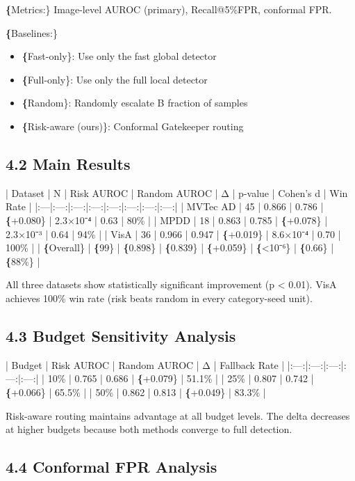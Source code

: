 \documentclass[10pt]{article}
\begin{document}
\textbf\{Metrics:\} Image-level AUROC (primary), Recall@5\%FPR, conformal FPR.

\textbf\{Baselines:\}
\begin{itemize}
\item \textbf\{Fast-only\}: Use only the fast global detector
\item \textbf\{Full-only\}: Use only the full local detector
\item \textbf\{Random\}: Randomly escalate B fraction of samples
\item \textbf\{Risk-aware (ours)\}: Conformal Gatekeeper routing
\end{itemize}

\subsection{4.2 Main Results}

| Dataset | N | Risk AUROC | Random AUROC | Δ | p-value | Cohen's d | Win Rate |
|:---|:---:|:---:|:---:|:---:|:---:|:---:|:---:|
| MVTec AD | 45 | 0.866 | 0.786 | \textbf\{+0.080\} | 2.3×10⁻⁴ | 0.63 | 80\% |
| MPDD | 18 | 0.863 | 0.785 | \textbf\{+0.078\} | 2.3×10⁻³ | 0.64 | 94\% |
| VisA | 36 | 0.966 | 0.947 | \textbf\{+0.019\} | 8.6×10⁻⁴ | 0.70 | 100\% |
| \textbf\{Overall\} | \textbf\{99\} | \textbf\{0.898\} | \textbf\{0.839\} | \textbf\{+0.059\} | \textbf\{<10⁻⁶\} | \textbf\{0.66\} | \textbf\{88\%\} |

All three datasets show statistically significant improvement (p < 0.01). VisA achieves 100\% win rate (risk beats random in every category-seed unit).

\subsection{4.3 Budget Sensitivity Analysis}

| Budget | Risk AUROC | Random AUROC | Δ | Fallback Rate |
|:---:|:---:|:---:|:---:|:---:|
| 10\% | 0.765 | 0.686 | \textbf\{+0.079\} | 51.1\% |
| 25\% | 0.807 | 0.742 | \textbf\{+0.066\} | 65.5\% |
| 50\% | 0.862 | 0.813 | \textbf\{+0.049\} | 83.3\% |

Risk-aware routing maintains advantage at all budget levels. The delta decreases at higher budgets because both methods converge to full detection.

\subsection{4.4 Conformal FPR Analysis}
\end{document}
